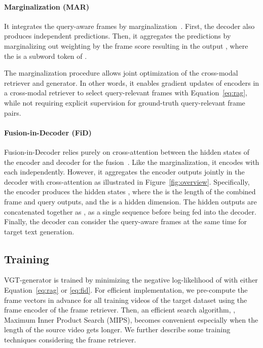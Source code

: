 \documentclass{article}
\begin{document}
\paragraph{Marginalization (MAR)}

It integrates the  query-aware frames by marginalization~\cite{lewis2020retrieval}. First, the decoder also produces independent  predictions. Then, it aggregates the  predictions by marginalizing out weighting by the frame score  resulting in the output , where the  is a subword token of .


The marginalization procedure allows joint optimization of the cross-modal retriever and generator. In other words, it enables gradient updates of encoders in a cross-modal retriever to select query-relevant frames with Equation~\ref{eq:rag}, while not requiring explicit supervision for ground-truth query-relevant frame pairs.

\paragraph{Fusion-in-Decoder (FiD)}

Fusion-in-Decoder relies purely on cross-attention between the hidden states of the encoder and decoder for the fusion~\cite{izacard2021leveraging}. Like the marginalization, it encodes  with each  independently. However, it aggregates the encoder outputs jointly in the decoder with cross-attention as illustrated in Figure~\ref{fig:overview}. Specifically, the encoder produces the hidden states , where the  is the length of the combined frame and query outputs, and the  is a hidden dimension. The  hidden outputs are concatenated together as , as a single sequence before being fed into the decoder. Finally, the decoder can consider the  query-aware frames at the same time for target text generation.


\subsection{Training}
\label{sec:sevit_training}

VGT-generator is trained by minimizing the negative log-likelihood of  with either Equation~\ref{eq:rag} or \ref{eq:fid}. For efficient implementation, we pre-compute the frame vectors in advance for all training videos of the target dataset using the frame encoder of the frame retriever. Then, an efficient search algorithm, \ie, Maximum Inner Product Search (MIPS), becomes convenient especially when the length of the source video gets longer.
We further describe some training techniques considering the frame retriever.
\end{document}
